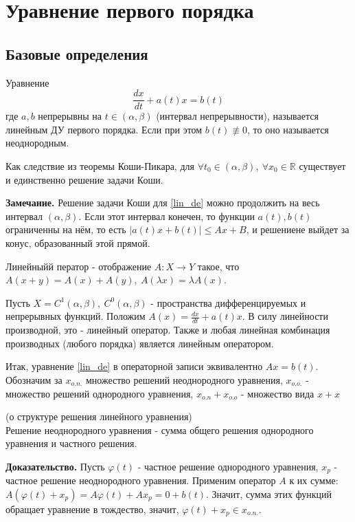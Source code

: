 \section{Уравнение первого порядка}
\subsection{Базовые определения}
\begin{defin}
Уравнение 
\begin{equation}\label{lin_de}
    \frac{dx}{dt}+a(t)x=b(t)
\end{equation}
где $a,b$ непрерывны на  $t\in (\alpha,\beta)$ (интервал непрерывности),
называется линейным ДУ первого порядка. Если при этом $b(t)\not\equiv 0$, то 
оно называется неоднородным.
\end{defin}
Как следствие из теоремы Коши-Пикара, для $\forall t_0\in (\alpha,\beta),~
\forall x_0\in \mathbb{R}$ существует и единственно решение задачи Коши.

\textbf{Замечание.} Решение задачи Коши для \ref{lin_de} можно продолжить
на весь интервал $(\alpha,\beta)$. Если этот интервал конечен, то функции
$a(t),b(t)$ ограниченны на нём, то есть  $|a(t)x+b(t)|\leqslant Ax+B$, 
и решениене выйдет за конус, образованный этой прямой. 

\begin{defin}
Линейныйй ператор - отображение $A\colon X\to Y$ %
такое, что $A(x+y)=A(x)+A(y),~A(\lambda x)=\lambda A(x)$.
\end{defin}
Пусть $X=C^1(\alpha,\beta),~C^0(\alpha,\beta)$ - пространства дифференцируемых
и непрерывных функций. Положим $A(x)=\frac{dx}{dt}+a(t)x$. В силу линейности
производной, это - линейный оператор. Также и любая линейная комбинация 
производных (любого порядка) является линейным оператором. 

Итак, уравнение \ref{lin_de} в операторной записи эквивалентно 
$Ax=b(t)$. Обозначим за $x_{o.n.}$ множество решений неоднородного уравнения,
$x_{o.o.}$ - множество решений однородного уравнения,  $x_{o.n}+x_{o.o}$ -
множество вида $x+x$

\begin{theor}
    (о структуре решения линейного уравнения)\\
    Решение неоднородного уравнения - сумма общего решения однородного 
    уравнения и частного решения.
\end{theor}
\textbf{Доказательство.} Пусть $\varphi(t)$ - частное решение однородного
уравнения, $x_{p}$ - частное решение неоднородного уравнения. Применим
оператор  $A$ к их сумме:  $A(\varphi(t)+x_p)=A\varphi(t)+Ax_p=0+b(t)$. 
Значит, сумма этих функций обращает уравнение в тождество, значит,
$\varphi(t)+x_p\in x_{o.n.}$.

